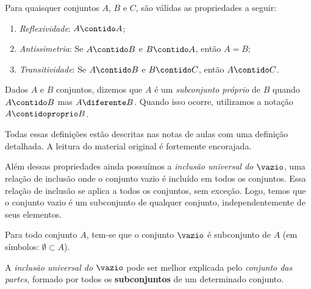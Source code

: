 \begin{definition}
	Para quaisquer conjuntos $A$, $B$ e $C$, são válidas as propriedades a seguir:
	\begin{enumerate}
		\item
			\label{inclusao:reflexividade}
			\emph{Reflexividade}: $A \contido A$;
		\item
			\label{inclusao:antissimetria}
			\emph{Antissimetria}: Se $A \contido B$ e $B \contido A$, então $A = B$;
		\item
			\label{inclusao:transitividade}
			\emph{Transitividade}: Se $A \contido B$ e $B \contido C$, então $A \contido C$.
	\end{enumerate}
\end{definition}

\begin{definition}
	Dados $A$ e $B$ conjuntos, dizemos que $A$ é um \emph{subconjunto próprio} de $B$ quando $A \contido B$ mas $A \diferente B$. Quando isso ocorre, utilizamos a notação $A \contidoproprio B$.
\end{definition}

\begin{remark}
    Todas essas definições estão descritas nas notas de aulas com uma definição detalhada. A leitura do material original é fortemente encorajada.
\end{remark}

Além dessas propriedades ainda possuímos a \emph{inclusão universal do $\vazio$}, uma relação de inclusão onde o conjunto vazio é incluído em todos os conjuntos. Essa relação de inclusão se aplica a todos os conjuntos, sem exceção. Logo, temos que o conjunto vazio é um subconjunto de qualquer conjunto, independentemente de seus elementos.

\begin{proposition}
	\label{prop:inclusao-universal-vazio}
	Para todo conjunto $A$, tem-se que o conjunto $\vazio$ é subconjunto de $A$ (em símbolos: $\emptyset \subset A$).
\end{proposition}

A \emph{inclusão universal do $\vazio$} pode ser melhor explicada pelo \emph{conjunto das partes}, formado por todos os \textbf{subconjuntos} de um determinado conjunto.

